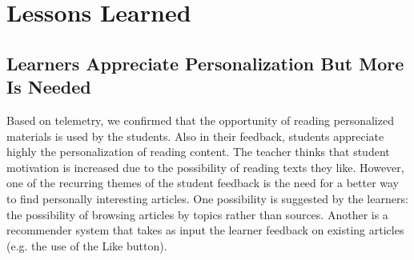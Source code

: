
\section{Lessons Learned}

\subsection{Learners Appreciate Personalization But More Is Needed}
Based on telemetry, we confirmed that the opportunity of reading personalized materials is used by the students. Also in their feedback, students appreciate highly the personalization of reading content. The teacher thinks that student motivation is increased due to the possibility of reading texts they like. 
% 
However, one of the recurring themes of the student feedback is the need for a better way to find personally interesting articles. One possibility is suggested by the learners: the possibility of browsing articles by topics rather than sources. Another is a recommender system that takes as input the learner feedback on existing articles (e.g. the use of the Like button).







